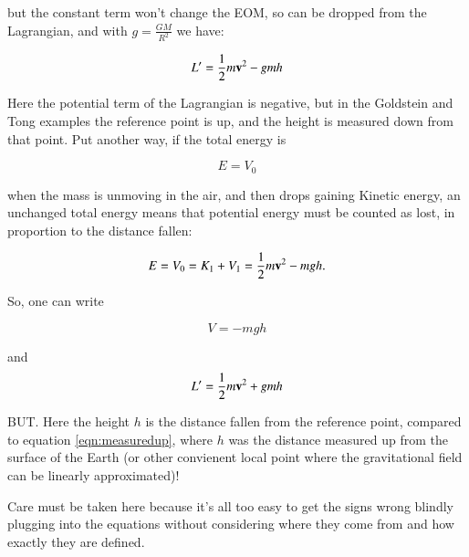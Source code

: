 \documentclass{article}      %
\begin{document}
but the constant term won't change the EOM, so can be dropped from the Lagrangian, and with $g=\frac{GM}{R^2}$ we have:

\begin{equation}\label{eqn:measuredup}
L' = \frac{1}{2} m \mathbf{v}^2 - g m h
\end{equation}

Here the potential term of the Lagrangian is negative, but in the Goldstein and Tong examples the reference point is up, and the height is measured down
from that point.  Put another way, if the total energy is 

\begin{equation*}
E = V_0
\end{equation*}

when the mass is unmoving in the air, and then drops gaining Kinetic energy, an unchanged total energy means that potential energy must be counted as lost, in proportion to the distance fallen:

\begin{equation*}
E = V_0 = K_1 + V_1 = \frac{1}{2} m \mathbf{v}^2 - m g h.
\end{equation*}

So, one can write

\begin{equation*}
V = -m g h
\end{equation*}

and 
\begin{equation}\label{eqn:measureddown}
L' = \frac{1}{2} m \mathbf{v}^2 + g m h
\end{equation}

BUT.  Here the height $h$ is the distance fallen from the reference point, compared to equation \ref{eqn:measuredup}, where $h$ was the distance measured up from the surface of the Earth (or other convienent local point where the gravitational field can be linearly approximated)!

Care must be taken here because it's all too easy to get the signs wrong blindly plugging into the equations without considering where they come from and how exactly they are defined.
\end{document}
